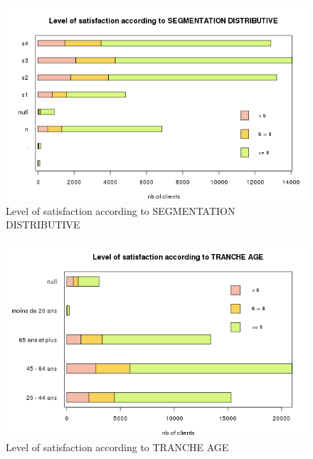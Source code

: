 \documentclass[a4paper, 11pt]{article}
\begin{document}
    \begin{figure}[!ht]
    	\centering
            \includegraphics[height = 10 cm]{Remi/Level_of_satisfaction_according_to_SEGMENTATION_DISTRIBUTIVE.png}
            \caption{Level of satisfaction according to SEGMENTATION DISTRIBUTIVE}
            \label{fig:SEGMENTATION_DISTRIBUTIVE}
    \end{figure}
    
    \begin{figure}[!ht]
    	\centering
            \includegraphics[height = 10 cm]{Remi/Level_of_satisfaction_according_to_TRANCHE_AGE.png}
            \caption{Level of satisfaction according to TRANCHE AGE}
            \label{fig:TRANCHE_AGE}
    \end{figure}
    
\end{document}
